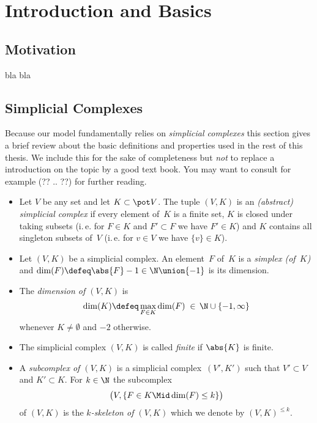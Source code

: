 \chapter{Introduction and Basics}
%
\section{Motivation}
bla bla  %


\section{Simplicial Complexes}
Because our model fundamentally relies on \emph{simplicial complexes}
this section gives a brief review about the basic definitions and properties
used in the rest of this thesis. We include this for the sake of completeness
but \emph{not} to replace a introduction on the topic by a good text book.
You may want to consult for example (?? .. ??) %
for further reading.
 
\begin{thDef}
    \begin{itemize}
        \item
            Let $V$ be any set and let $K\subset\pot V$. The tuple $(V,K)$ is
            an \emph{(abstract) simplicial complex} if every element of~$K$ is
            a finite set, $K$ is closed under taking subsets (i.\,e. for
            $F\in K$ and $F'\subset F$ we have $F'\in K$) and $K$ contains
            all singleton subsets of~$V$ (i.\,e. for $v\in V$ we have
            $\{v\}\in K$).
            
        \item
            Let $(V,K)$ be a simplicial complex. An element~$F$ of~$K$ is
            a \emph{simplex (of~$K$)} and $\dim(F)\defeq\abs{F}-1
            \in\N\union\{-1\}$ is its dimension.
            
        \item
            The \emph{dimension of $(V,K)$} is
            \[ \dim(K) \defeq \max_{F\in K} \dim(F) \;\in\,\N\cup\{-1,\infty\}
            \]
            whenever $K\neq\emptyset$ and $-2$ otherwise.
            
        \item
            The simplicial complex $(V,K)$ is called \emph{finite} if
            $\abs{K}$ is finite.
            
        \item
            A \emph{subcomplex of $(V,K)$} is a simplicial complex~$(V',K')$
            such that $V'\subset V$ and $K'\subset K$. For $k\in\N$ the
            subcomplex
            \[ \bigl( V, \{ F\in K \Mid \dim(F) \leq k \} \bigr) \]
            of $(V,K)$ is the \emph{$k$-skeleton of $(V,K)$} which
            we denote by $(V,K)^{\leq k}$.
    \end{itemize}
\end{thDef}


